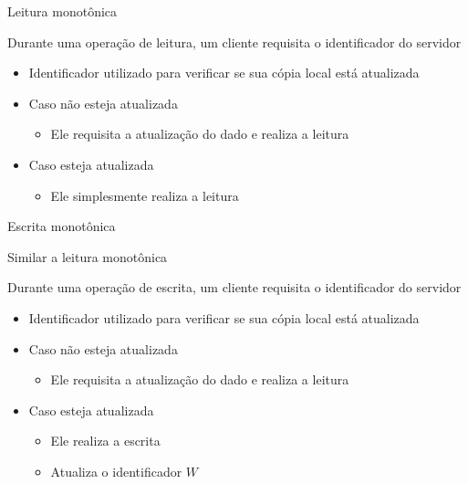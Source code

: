 \documentclass[compress]{beamer}
\begin{document}

\begin{frame}{Leitura monotônica}

Durante uma operação de leitura, um cliente requisita o identificador do servidor
\begin{itemize}
    \item Identificador utilizado para verificar se sua cópia local está atualizada
    \item Caso não esteja atualizada
    \begin{itemize}
        \item Ele requisita a atualização do dado e realiza a leitura
    \end{itemize}
    \item Caso esteja atualizada
    \begin{itemize}
        \item Ele simplesmente realiza a leitura
    \end{itemize}
\end{itemize}
    
\end{frame}


\begin{frame}{Escrita monotônica}

Similar a leitura monotônica

\vspace{0.5cm}

Durante uma operação de escrita, um cliente requisita o identificador do servidor
\begin{itemize}
    \item Identificador utilizado para verificar se sua cópia local está atualizada
    \item Caso não esteja atualizada
    \begin{itemize}
        \item Ele requisita a atualização do dado e realiza a leitura
    \end{itemize}
    \item Caso esteja atualizada
    \begin{itemize}
        \item Ele realiza a escrita
        \item Atualiza o identificador $W$
    \end{itemize}
\end{itemize}
    
\end{frame}
\end{document}
